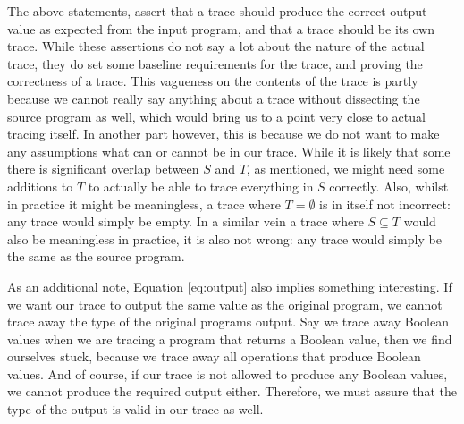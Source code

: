         The above statements, assert that a trace should produce the correct output value as expected from the input program, and that a trace should be its own trace.
        While these assertions do not say a lot about the nature of the actual trace, they do set some baseline requirements for the trace, and proving the correctness of a trace.
        This vagueness on the contents of the trace is partly because we cannot really say anything about a trace without dissecting the source program as well, which would bring us to a point very close to actual tracing itself.
        In another part however, this is because we do not want to make any assumptions what can or cannot be in our trace.
        While it is likely that some there is significant overlap between $S$ and $T$, as mentioned, we might need some additions to $T$ to actually be able to trace everything in $S$ correctly.
        Also, whilst in practice it might be meaningless, a trace where $T=\emptyset$ is in itself not incorrect: any trace would simply be empty.
        In a similar vein a trace where $S\subseteq T$ would also be meaningless in practice, it is also not wrong: any trace would simply be the same as the source program.

        As an additional note, Equation \ref{eq:output} also implies something interesting.
        If we want our trace to output the same value as the original program, we cannot trace away the type of the original programs output.
        Say we trace away Boolean values when we are tracing a program that returns a Boolean value, then we find ourselves stuck, because we trace away all operations that produce Boolean values.
        And of course, if our trace is not allowed to produce any Boolean values, we cannot produce the required output either.
        Therefore, we must assure that the type of the output is valid in our trace as well.

